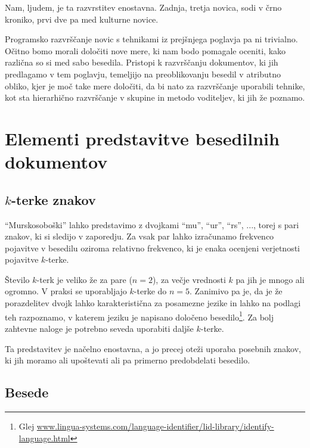 Nam, ljudem, je ta razvrstitev enostavna. Zadnja, tretja novica, sodi
v črno kroniko, prvi dve pa med kulturne novice.

Programsko razvrščanje novic s tehnikami iz prejšnjega poglavja pa ni
trivialno. Očitno bomo morali določiti nove mere, ki nam bodo pomagale
oceniti, kako različna so si med sabo besedila. Pristopi k razvrščanju
dokumentov, ki jih predlagamo v tem poglavju, temeljijo na
preoblikovanju besedil v atributno obliko, kjer je moč take mere
določiti, da bi nato za razvrščanje uporabili tehnike, kot sta
hierarhično razvrščanje v skupine in metodo voditeljev, ki jih že
poznamo.

\section{Elementi predstavitve besedilnih dokumentov}

\subsection{$k$-terke znakov}

``Murskosoboški'' lahko predstavimo z dvojkami ``mu'', ``ur'', ``rs'',
..., torej s pari znakov, ki si sledijo v zaporedju. Za vsak par lahko
izračunamo frekvenco pojavitve v besedilu oziroma relativno frekvenco,
ki je enaka ocenjeni verjetnosti pojavitve $k$-terke. 

Število $k$-terk je veliko že za pare ($n=2$), za večje vrednosti $k$
pa jih je mnogo ali ogromno. V praksi se uporabljajo $k$-terke do
$n=5$. Zanimivo pa je, da je že porazdelitev dvojk lahko
karakteristična za posamezne jezike in lahko na podlagi teh
razpoznamo, v katerem jeziku je napisano določeno
besedilo\footnote{Glej
  \url{www.lingua-systems.com/language-identifier/lid-library/identify-language.html}}. Za
bolj zahtevne naloge je potrebno seveda uporabiti daljše $k$-terke.

Ta predstavitev je načelno enostavna, a jo precej oteži uporaba
posebnih znakov, ki jih moramo ali upoštevati ali pa primerno
predobdelati besedilo.

\subsection{Besede}

